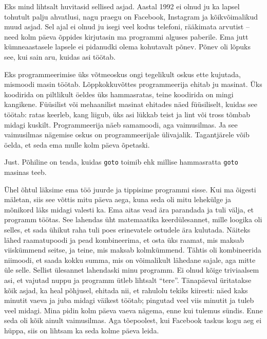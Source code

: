
Eks mind lihtsalt huvitasid sellised asjad. Aastal 1992 ei olnud ju ka lapsel 
tohutult palju ahvatlusi, nagu praegu on 
Facebook, Instagram ja kõikvõimalikud 
muud asjad. Sel ajal ei olnud ju isegi veel kodus telefoni, rääkimata arvutist 
– need kolm päeva õppides kirjutasin ma programmi  
alguses paberile. Ema jutt kümneaastasele lapsele ei pidanudki olema
kohutavalt põnev. Põnev oli lõpuks  
see, kui sain aru, kuidas asi töötab.


Eks programmeerimise üks võtmeoskus ongi tegelikult 
oskus ette kujutada, mismoodi masin töötab. Lõppkokkuvõttes  
programmeerija ehitab ju masinat. Üks koodirida on 
piltlikult öeldes üks hammasratas, teine koodirida on mingi kangikene. 
Füüsilist või mehaanilist 
masinat ehitades näed füüsiliselt, kuidas see töötab: ratas keerleb, 
kang liigub, üks asi lükkab teist ja 
lint või tross tõmbab midagi kuskilt. 
Programmeerija näeb samamoodi, aga vaimusilmas. Ja see vaimusilmas nägemise 
oskus on 
programmeerijale ülivajalik. Tagantjärele võib öelda, et seda ema mulle 
kolm päeva õpetaski.


Just. Põhiline on teada, kuidas \verb|goto| toimib ehk 
millise hammasratta \verb|goto| masinas teeb.


Ühel õhtul läksime ema töö juurde ja  
tippisime programmi sisse. Kui ma õigesti mäletan, siis see
võttis mitu päeva aega, kuna seda oli mitu lehekülge ja mõnikord läks midagi 
valesti ka. Ema aitas vead ära parandada ja tuli välja, et programm 
töötas. See lahendas üht matemaatika keerdülesannet, mille
loogika oli selles, et sada ühikut raha tuli poes erinevatele ostudele ära 
kulutada. Näiteks lähed 
raamatupoodi ja pead 
kombineerima, et osta üks raamat, mis maksab viiskümmend seitse, ja teine, mis 
maksab kolmkümmend. Tähtis oli kombineerida niimoodi, et saada kokku summa, mis 
on võimalikult 
lähedane sajale, aga mitte üle selle. Sellist ülesannet lahendaski minu 
programm. Ei olnud kõige triviaalsem asi, et 
vajutad nuppu ja programm ütleb lihtsalt \enquote{tere}. Tänapäeval üritatakse 
kõik asjad, ka heal põhjusel, ehitada nii, et rahulolu tekiks 
kiiresti: näed kaks minutit vaeva ja 
juba midagi väikest töötab; pingutad veel viis minutit 
ja tuleb veel midagi. Mina pidin kolm päeva vaeva nägema, enne 
kui tulemus sündis. Enne seda oli kõik ainult vaimusilmas. Aga tõepoolest, kui 
Facebook taskus kogu aeg ei hüppa, siis on lihtsam ka seda kolme 
päeva leida. 

